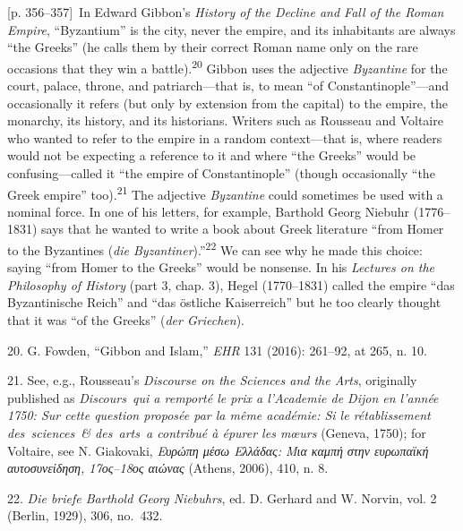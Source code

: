 \documentclass[10pt,a4paper]{article}
\begin{document}
{\scriptsize\color{gray}[p. 356–357]}\ In Edward Gibbon’s \textit{History of the Decline and Fall of the Roman Empire}, “Byzantium” is the city, never the empire, and its inhabitants are always “the Greeks” (he calls them by their correct Roman name only on the rare occasions that they win a battle).\nobreak\textsuperscript{20} Gibbon uses the adjective \textit{Byzantine} for the court, palace, throne, and patriarch—that is, to mean “of Constantinople”—and occasionally it refers (but only by extension from the capital) to the empire, the monarchy, its history, and its historians. Writers such as Rousseau and Voltaire who wanted to refer to the empire in a random context—that is, where readers would not be expecting a reference to it and where “the Greeks” would be confusing—called it “the empire of Constantinople” (though occasionally “the Greek empire” too).\nobreak\textsuperscript{21} The adjective \textit{Byzantine} could sometimes be used with a nominal force. In one of his letters, for example, Barthold Georg Niebuhr (1776–1831) says that he wanted to write a book about Greek literature “from Homer to the Byzantines (\textit{die Byzantiner}).”\nobreak\textsuperscript{22} We can see why he made this choice: saying “from Homer to the Greeks” would be nonsense. In his\textit{ Lectures on the Philosophy of History }(part 3, chap. 3), Hegel (1770–1831) called the empire “das Byzantinische Reich” and “das östliche Kaiserreich” but he too clearly thought that it was “of the Greeks” (\textit{der Griechen}).\par{\small 20. G. Fowden, “Gibbon and Islam,” \textit{EHR} 131 (2016): 261–92, at 265, n. 10.\par}{\small 21.  See, e.g., Rousseau’s \textit{Discourse on the Sciences and the Arts}, originally published as \textit{Discours qui a remporté le prix a l’Academie de Dijon en l’année 1750: Sur cette question proposée par la même académie: Si le rétablissement des sciences \& des arts a contribué à épurer les mœurs} (Geneva, 1750); for Voltaire, see N. Giakovaki, \textit{Ευρώπη μέσω Ελλάδας: Μια καμπή στην ευρωπαϊκή αυτοσυνείδηση, 17ος–18ος αιώνας} (Athens, 2006), 410, n. 8.\par}{\small 22. \textit{Die briefe Barthold Georg Niebuhrs}, ed. D. Gerhard and W. Norvin, vol. 2 (Berlin, 1929), 306, no. 432.\par}
\end{document}
